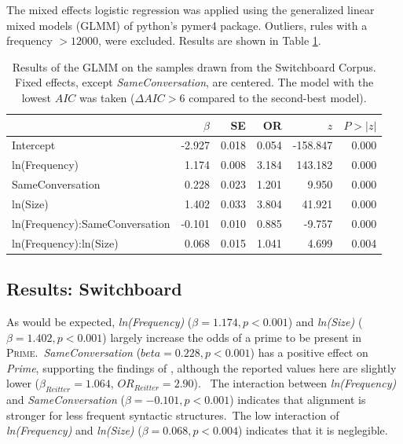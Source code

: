 \documentclass[11pt]{article}
\begin{document}
The mixed effects logistic regression was applied using the generalized linear mixed models (GLMM) of python's pymer4 package. Outliers, rules with a frequency $> 12000$, were excluded. Results are shown in Table \ref{tab:human}.


\begin{table}
  \centering
  \begin{tabular}{lrrrrr}
    \hline
    &$\beta$&SE&OR& $z$& $P>|z|$\\
    \hline
    Intercept&
    -2.927& 0.018& 0.054&  -158.847& 0.000\\
    
    ln(Frequency)&
    1.174& 0.008& 3.184& 143.182& 0.000\\
    
    SameConversation&
    0.228& 0.023& 1.201& 9.950& 0.000\\
    
    ln(Size)&
    1.402& 0.033& 3.804& 41.921& 0.000\\
    ln(Frequency):SameConversation&
    -0.101& 0.010& 0.885& -9.757& 0.000\\
    ln(Frequency):ln(Size)&
    0.068& 0.015& 1.041& 4.699& 0.004\\
    \hline
    
  \end{tabular}
  \caption{\label{tab:human}
  Results of the GLMM on the samples drawn from the Switchboard Corpus. Fixed effects, except \textit{SameConversation}, are centered. The model with the lowest $AIC$ was taken ($\Delta AIC>6$ compared to the second-best model).}
  
\end{table}
\subsection{Results: Switchboard}
As would be expected, \textit{ln(Frequency)} ($\beta=1.174, p<0.001$) and \textit{ln(Size)} ($\beta=1.402, p<0.001$) largely increase the odds of a prime to be present in \textsc{Prime}.\
\textit{SameConversation} ($beta=0.228, p<0.001$) has a positive effect on \textit{Prime}, supporting the findings of \citealp{reitter2008context}, although the reported values here are slightly lower ($\beta_{Reitter}=1.064$, $OR_{Reitter} = 2.90$). \
The interaction between \textit{ln(Frequency)} and \textit{SameConversation} ($\beta=-0.101, p<0.001$) indicates that alignment is stronger for less frequent syntactic structures.\
The low interaction of \textit{ln(Frequency)} and \textit{ln(Size)} ($\beta=0.068, p<0.004$) indicates that it is neglegible.
\end{document}
